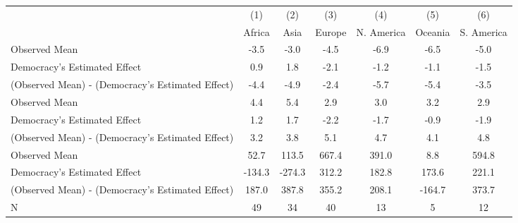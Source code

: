 {
\def\sym#1{\ifmmode^{#1}\else\(^{#1}\)\fi}
\begin{tabular}{l*{6}{c}}
\hline\hline
                    &\multicolumn{1}{c}{(1)}&\multicolumn{1}{c}{(2)}&\multicolumn{1}{c}{(3)}&\multicolumn{1}{c}{(4)}&\multicolumn{1}{c}{(5)}&\multicolumn{1}{c}{(6)}\\
                    &      Africa&        Asia&      Europe&  N. America&     Oceania&  S. America\\
\hline
Observed Mean       &        -3.5&        -3.0&        -4.5&        -6.9&        -6.5&        -5.0\\
Democracy's Estimated Effect&         0.9&         1.8&        -2.1&        -1.2&        -1.1&        -1.5\\
(Observed Mean) - (Democracy's Estimated Effect)&        -4.4&        -4.9&        -2.4&        -5.7&        -5.4&        -3.5\\
Observed Mean       &         4.4&         5.4&         2.9&         3.0&         3.2&         2.9\\
Democracy's Estimated Effect&         1.2&         1.7&        -2.2&        -1.7&        -0.9&        -1.9\\
(Observed Mean) - (Democracy's Estimated Effect)&         3.2&         3.8&         5.1&         4.7&         4.1&         4.8\\
Observed Mean       &        52.7&       113.5&       667.4&       391.0&         8.8&       594.8\\
Democracy's Estimated Effect&      -134.3&      -274.3&       312.2&       182.8&       173.6&       221.1\\
(Observed Mean) - (Democracy's Estimated Effect)&       187.0&       387.8&       355.2&       208.1&      -164.7&       373.7\\
\hline
N                   &          49&          34&          40&          13&           5&          12\\
\hline\hline
\end{tabular}
}
